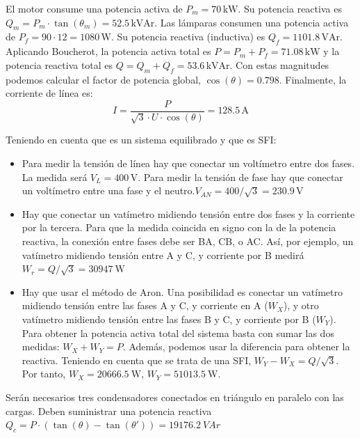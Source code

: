 El motor consume una potencia activa de $P_m = 70\,\mathrm{kW}$. Su
potencia reactiva es
$Q_m = P_m \cdot \tan(\theta_m) = 52.5\,\mathrm{kVAr}$.  Las lámparas
consumen una potencia activa de $P_f = 90 \cdot 12 =
1080\,\mathrm{W}$. Su potencia reactiva (inductiva) es
$Q_f = 1101.8\,\mathrm{VAr}$.  Aplicando Boucherot, la potencia activa
total es $P = P_m + P_f = 71.08\,\mathrm{kW}$ y la potencia reactiva
total es $Q = Q_m + Q_f = 53.6\,\mathrm{kVAr}$. Con estas magnitudes
podemos calcular el factor de potencia global, $\cos(\theta) =
0.798$. Finalmente, la corriente de línea es:
\[
  I = \frac{P}{\sqrt3 \cdot U \cdot \cos(\theta)} = 128.5\,\mathrm{A}
\]


Teniendo en cuenta que es un sistema equilibrado y que es SFI:
\begin{itemize}

\item Para medir la tensión de línea hay que conectar un voltímetro
  entre dos fases. La medida será $V_{L} = 400\,\mathrm{V}$. Para medir
  la tensión de fase hay que conectar un voltímetro entre una fase y
  el neutro.$V_{AN} = 400 / \sqrt{3} = 230.9\,\mathrm{V}$

\item Hay que conectar un vatímetro midiendo tensión entre dos fases y
  la corriente por la tercera. Para que la medida coincida en signo
  con la de la potencia reactiva, la conexión entre fases debe ser BA,
  CB, o AC. Así, por ejemplo, un vatímetro midiendo tensión entre A y
  C, y corriente por B medirá $W_r = Q / \sqrt{3} = \qty{30947}{\watt}$

\item Hay que usar el método de Aron. Una posibilidad es conectar un
  vatímetro midiendo tensión entre las fases A y C, y corriente en A
  ($W_X$), y otro vatímetro midiendo tensión entre las fases B y C, y
  corriente por B ($W_Y$). Para obtener la potencia activa total del
  sistema basta con sumar las dos medidas: $W_{X} + W_{Y} =
  P$. Además, podemos usar la diferencia para obtener la
  reactiva. Teniendo en cuenta que se trata de una SFI,
  $W_Y - W_X = Q/\sqrt{3}$. Por tanto, $W_X = \SI{20666.5}{\watt}$,
  $W_Y = \SI{51013.5}{\watt}$.

\end{itemize}


Serán necesarios tres condensadores conectados en triángulo en
paralelo con las cargas. Deben suministrar una potencia reactiva
$Q_c = P \cdot (\tan(\theta) - \tan(\theta')) = \SI{19176.2}{VAr}$

